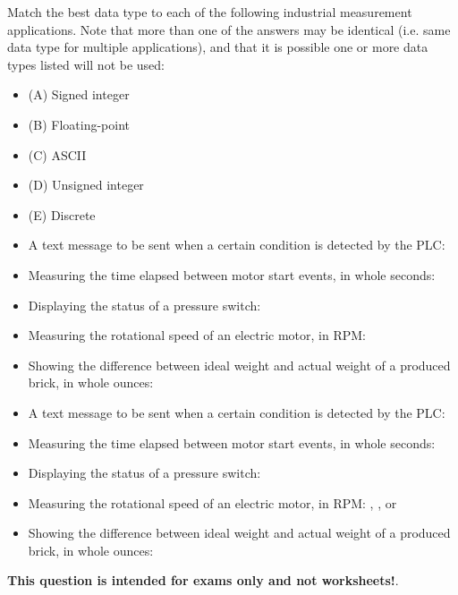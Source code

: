 

Match the best data type to each of the following industrial measurement applications.  Note that more than one of the answers may be identical (i.e. same data type for multiple applications), and that it is possible one or more data types listed will not be used:

\begin{itemize}
\item{} (A) Signed integer
\item{} (B) Floating-point
\item{} (C) ASCII
\item{} (D) Unsigned integer
\item{} (E) Discrete
\end{itemize}

\begin{itemize}
\item{} A text message to be sent when a certain condition is detected by the PLC: \underbar{\hskip 50pt}
\vskip 10pt
\item{} Measuring the time elapsed between motor start events, in whole seconds: \underbar{\hskip 50pt}
\vskip 10pt
\item{} Displaying the status of a pressure switch: \underbar{\hskip 50pt}
\vskip 10pt
\item{} Measuring the rotational speed of an electric motor, in RPM: \underbar{\hskip 50pt}
\vskip 10pt
\item{} Showing the difference between ideal weight and actual weight of a produced brick, in whole ounces: \underbar{\hskip 50pt}
\end{itemize}







\begin{itemize}
\item{} A text message to be sent when a certain condition is detected by the PLC: 
\vskip 10pt
\item{} Measuring the time elapsed between motor start events, in whole seconds: 
\vskip 10pt
\item{} Displaying the status of a pressure switch: 
\vskip 10pt
\item{} Measuring the rotational speed of an electric motor, in RPM: , , or 
\vskip 10pt
\item{} Showing the difference between ideal weight and actual weight of a produced brick, in whole ounces: 
\end{itemize}








{\bf This question is intended for exams only and not worksheets!}.


